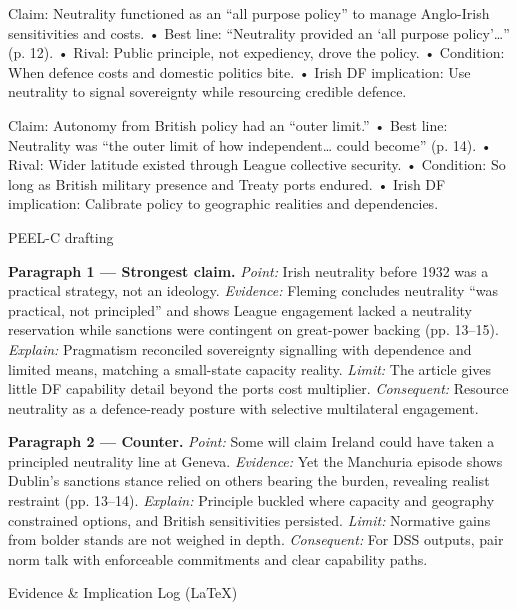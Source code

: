 Claim: Neutrality functioned as an “all purpose policy” to manage Anglo-Irish sensitivities and costs.
• Best line: “Neutrality provided an ‘all purpose policy’…” (p. 12).
• Rival: Public principle, not expediency, drove the policy.
• Condition: When defence costs and domestic politics bite.
• Irish DF implication: Use neutrality to signal sovereignty while resourcing credible defence.

Claim: Autonomy from British policy had an “outer limit.”
• Best line: Neutrality was “the outer limit of how independent… could become” (p. 14).
• Rival: Wider latitude existed through League collective security.
• Condition: So long as British military presence and Treaty ports endured.
• Irish DF implication: Calibrate policy to geographic realities and dependencies.

PEEL-C drafting

\textbf{Paragraph 1 — Strongest claim.}
\textit{Point:} Irish neutrality before 1932 was a practical strategy, not an ideology.
\textit{Evidence:} Fleming concludes neutrality “was practical, not principled” and shows League engagement lacked a neutrality reservation while sanctions were contingent on great-power backing (pp. 13–15).
\textit{Explain:} Pragmatism reconciled sovereignty signalling with dependence and limited means, matching a small-state capacity reality.
\textit{Limit:} The article gives little DF capability detail beyond the ports cost multiplier.
\textit{Consequent:} Resource neutrality as a defence-ready posture with selective multilateral engagement.

\textbf{Paragraph 2 — Counter.}
\textit{Point:} Some will claim Ireland could have taken a principled neutrality line at Geneva.
\textit{Evidence:} Yet the Manchuria episode shows Dublin’s sanctions stance relied on others bearing the burden, revealing realist restraint (pp. 13–14).
\textit{Explain:} Principle buckled where capacity and geography constrained options, and British sensitivities persisted.
\textit{Limit:} Normative gains from bolder stands are not weighed in depth.
\textit{Consequent:} For DSS outputs, pair norm talk with enforceable commitments and clear capability paths.

Evidence \& Implication Log (LaTeX)


